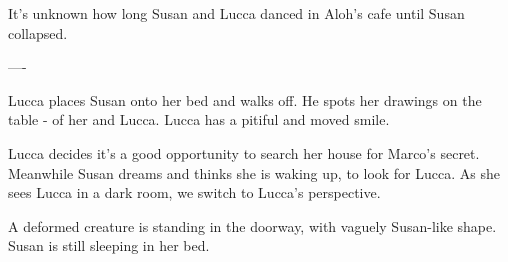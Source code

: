 \documentclass[11pt]{article}
\begin{document}
It's unknown how long Susan and Lucca danced in Aloh's cafe until Susan collapsed.

----

Lucca places Susan onto her bed and walks off. He spots her drawings on the table - of her and Lucca. Lucca has a pitiful and moved smile.

Lucca decides it's a good opportunity to search her house for Marco's secret. 
Meanwhile Susan dreams and thinks she is waking up, to look for Lucca.
As she sees Lucca in a dark room, we switch to Lucca's perspective. 

A deformed creature is standing in the doorway, with vaguely Susan-like shape. 
Susan is still sleeping in her bed.
\end{document}
